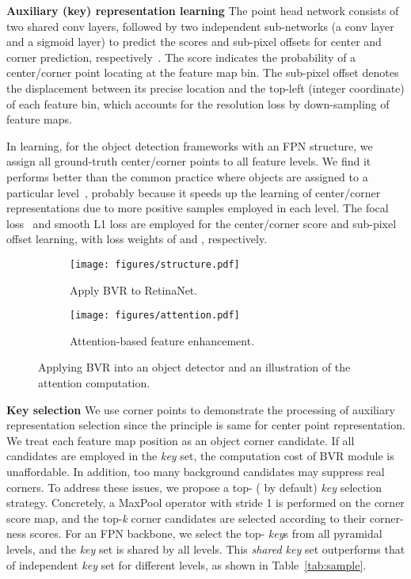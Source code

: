 \documentclass{article}
\begin{document}
{\noindent \textbf{Auxiliary (key) representation learning}}\hspace{3pt} The point head network consists of two shared  conv layers, followed by two independent sub-networks (a  conv layer and a sigmoid layer) to predict the scores and sub-pixel offsets for center and corner prediction, respectively~\cite{CornerNet}. The score indicates the probability of a center/corner point locating at the feature map bin. The sub-pixel offset  denotes the displacement between its precise location and the top-left (integer coordinate) of each feature bin, which accounts for the resolution loss by down-sampling of feature maps.

In learning, for the object detection frameworks with an FPN structure, we assign all ground-truth center/corner points to all feature levels. We find it performs better than the common practice where objects are assigned to a particular level~\cite{FPN,RetinaNet,FCOS,CornerNet,RepPoints}, probably because it speeds up the learning of center/corner representations due to more positive samples employed in each level. The focal loss~\cite{RetinaNet} and smooth L1 loss are employed for the center/corner score and sub-pixel offset learning, with loss weights of  and , respectively.

\begin{figure*}[t]
\begin{subfigure}{.45\textwidth}
  \centering
\texttt{[image: figures/structure.pdf]}  
  \caption{Apply BVR to RetinaNet.}
  \label{fig:structure-1}
\end{subfigure}
\begin{subfigure}{.55\textwidth}
  \centering
\texttt{[image: figures/attention.pdf]}
  \caption{Attention-based feature enhancement.}
  \label{fig:structure-2}
\end{subfigure}
\caption{Applying BVR into an object detector and an illustration of the attention computation.}
\label{fig:structure}
\vspace{-1em}
\end{figure*}

{\noindent \textbf{Key selection}}\hspace{3pt} We use corner points to demonstrate the processing of auxiliary representation selection since the principle is same for center point representation. We treat each feature map position as an object corner candidate. If all candidates are employed in the \emph{key} set, the computation cost of BVR module is unaffordable. In addition, too many background candidates may suppress real corners. To address these issues, we propose a top- ( by default) \emph{key} selection strategy. Concretely, a  MaxPool operator with stride 1 is performed on the corner score map, and the top-\emph{k} corner candidates are selected according to their corner-ness scores. For an FPN backbone, we select the top- \emph{key}s from all pyramidal levels, and the \emph{key} set is shared by all levels. This \emph{shared key} set outperforms that of independent \emph{key} set for different levels, as shown in Table~\ref{tab:sample}.
\end{document}
